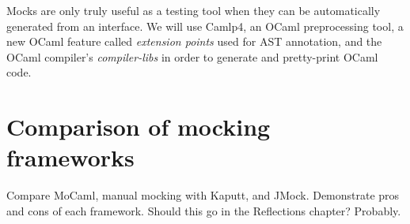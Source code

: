 Mocks are only truly useful as a testing tool when they can be
automatically generated from an interface. We will use Camlp4, an
OCaml preprocessing tool, a new OCaml feature called \textit{extension
  points} used for AST annotation, and the OCaml compiler's
\textit{compiler-libs} in order to generate and pretty-print OCaml
code.

\section{Comparison of mocking frameworks}
\label{application:comparison}

Compare MoCaml, manual mocking with Kaputt, and JMock. Demonstrate
pros and cons of each framework. Should this go in the Reflections
chapter? Probably.
